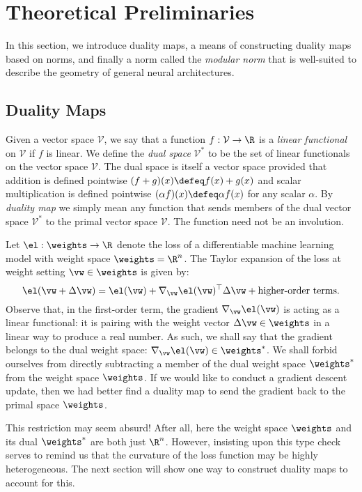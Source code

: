\section{Theoretical Preliminaries}

In this section, we introduce duality maps, a means of constructing duality maps based on norms, and finally a norm called the \textit{modular norm} that is well-suited to describe the geometry of general neural architectures.

\subsection{Duality Maps}\label{sec:steepest-descent}

Given a vector space $\mathcal{V}$, we say that a function $f:\mathcal{V} \to \R$ is a \textit{linear functional} on $\mathcal{V}$ if $f$ is linear. We define the \textit{dual space} $\mathcal{V}^*$ to be the set of linear functionals on the vector space $\mathcal{V}$. The dual space is itself a vector space provided that addition is defined pointwise $(f+g)(x) \defeq f(x) + g(x)$ and scalar multiplication is defined pointwise $(\alpha f)(x) \defeq \alpha f(x)$ for any scalar $\alpha$. By \textit{duality map} we simply mean any function that sends members of the dual vector space $\mathcal{V}^*$ to the primal vector space $\mathcal{V}$. The function need not be an involution.

Let $\el:\weights \to \R$ denote the loss of a differentiable machine learning model with weight space $\weights=\R^n$. The Taylor expansion of the loss at weight setting $\vw \in \weights$ is given by:
\begin{equation}\label{eq:taylor}
    \el(\vw+\Delta\vw) = \el(\vw) + \nabla_\vw\el(\vw)^\top \Delta \vw + \text{higher-order terms}.
\end{equation}
Observe that, in the first-order term, the gradient $\nabla_\vw\el(\vw)$ is acting as a linear functional: it is pairing with the weight vector $\Delta \vw \in \weights$ in a linear way to produce a real number. As such, we shall say that the gradient belongs to the dual weight space: $\nabla_\vw\el(\vw)\in\weights^*$. We shall forbid ourselves from directly subtracting a member of the dual weight space $\weights^*$ from the weight space $\weights$. If we would like to conduct a gradient descent update, then we had better find a duality map to send the gradient back to the primal space $\weights$.

This restriction may seem absurd! After all, here the weight space $\weights$ and its dual $\weights^*$ are both just $\R^n$. However, insisting upon this type check serves to remind us that the curvature of the loss function may be highly heterogeneous. The next section will show one way to construct duality maps to account for this.

